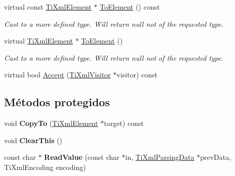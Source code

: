 \begin{DoxyCompactItemize}
\item 
\hypertarget{classTiXmlElement_ac5b8d0e25fa23fd9acbb6d146082901c}{virtual const \hyperlink{classTiXmlElement}{\-Ti\-Xml\-Element} $\ast$ \hyperlink{classTiXmlElement_ac5b8d0e25fa23fd9acbb6d146082901c}{\-To\-Element} () const }\label{classTiXmlElement_ac5b8d0e25fa23fd9acbb6d146082901c}

\begin{DoxyCompactList}\small\item\em \-Cast to a more defined type. \-Will return null not of the requested type. \end{DoxyCompactList}\item 
\hypertarget{classTiXmlElement_a9def86337ea7a755eb41cac980f60c7a}{virtual \hyperlink{classTiXmlElement}{\-Ti\-Xml\-Element} $\ast$ \hyperlink{classTiXmlElement_a9def86337ea7a755eb41cac980f60c7a}{\-To\-Element} ()}\label{classTiXmlElement_a9def86337ea7a755eb41cac980f60c7a}

\begin{DoxyCompactList}\small\item\em \-Cast to a more defined type. \-Will return null not of the requested type. \end{DoxyCompactList}\item 
virtual bool \hyperlink{classTiXmlElement_a31ab28cc3b892a69254391d6bbe08df3}{\-Accept} (\hyperlink{classTiXmlVisitor}{\-Ti\-Xml\-Visitor} $\ast$visitor) const 
\end{DoxyCompactItemize}
\subsection*{\-Métodos protegidos}
\begin{DoxyCompactItemize}
\item 
\hypertarget{classTiXmlElement_a9e0c1983b840de4134f1f6bf7af00b0f}{void {\bfseries \-Copy\-To} (\hyperlink{classTiXmlElement}{\-Ti\-Xml\-Element} $\ast$target) const }\label{classTiXmlElement_a9e0c1983b840de4134f1f6bf7af00b0f}

\item 
\hypertarget{classTiXmlElement_a5670933ec2d7d9763b9891acc05d7f7d}{void {\bfseries \-Clear\-This} ()}\label{classTiXmlElement_a5670933ec2d7d9763b9891acc05d7f7d}

\item 
\hypertarget{classTiXmlElement_ac786bce103042d3837c4cc2ff6967d41}{const char $\ast$ {\bfseries \-Read\-Value} (const char $\ast$in, \hyperlink{classTiXmlParsingData}{\-Ti\-Xml\-Parsing\-Data} $\ast$prev\-Data, \-Ti\-Xml\-Encoding encoding)}\label{classTiXmlElement_ac786bce103042d3837c4cc2ff6967d41}

\end{DoxyCompactItemize}


